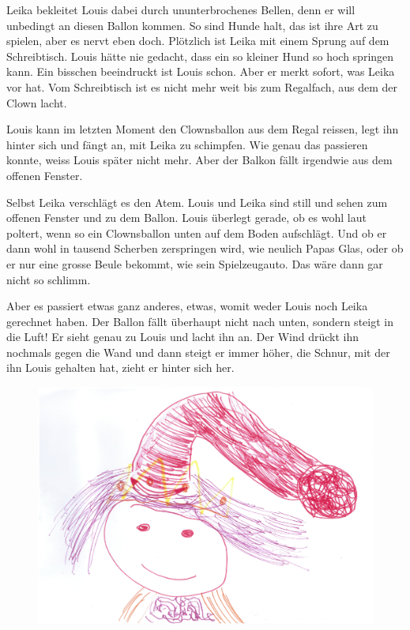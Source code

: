 Leika bekleitet Louis dabei durch ununterbrochenes Bellen, denn er will unbedingt an diesen Ballon kommen. So sind Hunde halt, das ist ihre Art zu spielen, aber es nervt eben doch. Plötzlich ist Leika mit einem Sprung auf dem Schreibtisch. Louis hätte nie gedacht, dass ein so kleiner Hund so hoch springen kann. Ein bisschen beeindruckt ist Louis schon. Aber er merkt sofort, was Leika vor hat. Vom Schreibtisch ist es nicht mehr weit bis zum Regalfach, aus dem der Clown lacht. 

Louis kann im letzten Moment den Clownsballon aus dem Regal reissen, legt ihn hinter sich und fängt an, mit Leika zu schimpfen. Wie genau das passieren konnte, weiss Louis später nicht mehr. Aber der Balkon fällt irgendwie aus dem offenen Fenster.

Selbst Leika verschlägt es den Atem. Louis und Leika sind still und sehen zum offenen Fenster und zu dem Ballon. Louis überlegt gerade, ob es wohl laut poltert, wenn so ein Clownsballon unten auf dem Boden aufschlägt. Und ob er dann wohl in tausend Scherben zerspringen wird, wie neulich Papas Glas, oder ob er nur eine grosse Beule bekommt, wie sein Spielzeugauto. Das wäre dann gar nicht so schlimm.

Aber es passiert etwas ganz anderes, etwas, womit weder Louis noch Leika gerechnet haben. Der Ballon fällt überhaupt nicht nach unten, sondern steigt in die Luft! Er sieht genau zu Louis und lacht ihn an. Der Wind drückt ihn nochmals gegen die Wand und dann steigt er immer höher, die Schnur, mit der ihn Louis gehalten hat, zieht er hinter sich her.

\begin{figure}[ht]
\centering
\includegraphics[width=\textwidth]{bilder/clown2.pdf}
\end{figure}


